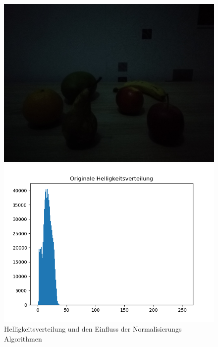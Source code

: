 \documentclass[a4paper,12pt,oneside]{article}
\begin{document}
\begin{figure}[htb]
\center
\caption{Helligkeitsverteilung und den Einfluss der Normalisierungs Algorithmen}
\label{img:hellver}
\begin{minipage}{0.4\textwidth}
\includegraphics[width=.8\textwidth]{Sources/Anhang/resize_0250.jpg}
\end{minipage}
\begin{minipage}{0.4\textwidth}
\includegraphics[width=\textwidth]{Sources/Anhang/resize_0250.png}
\end{minipage}
\end{figure}
\end{document}
